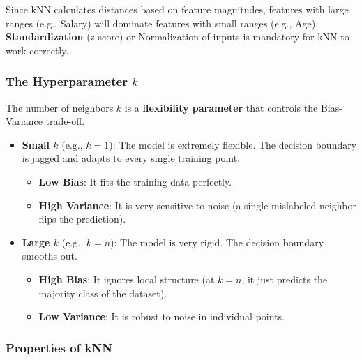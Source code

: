 \begin{tipsblock}
    Since kNN calculates distances based on feature magnitudes, features with large ranges (e.g., Salary) will dominate features with small ranges (e.g., Age). \textbf{Standardization} (z-score) or Normalization of inputs is mandatory for kNN to work correctly.
\end{tipsblock}

\subsubsection{The Hyperparameter $k$}

The number of neighbors $k$ is a \textbf{flexibility parameter} that controls the Bias-Variance trade-off.

\begin{itemize}
    \item \textbf{Small $k$} (e.g., $k=1$): The model is extremely flexible. The decision boundary is jagged and adapts to every single training point.
    \begin{itemize}
        \item \textbf{Low Bias}: It fits the training data perfectly.
        \item \textbf{High Variance}: It is very sensitive to noise (a single mislabeled neighbor flips the prediction).
    \end{itemize}

    \item \textbf{Large $k$} (e.g., $k=n$): The model is very rigid. The decision boundary smooths out.
    \begin{itemize}
        \item \textbf{High Bias}: It ignores local structure (at $k=n$, it just predicts the majority class of the dataset).
        \item \textbf{Low Variance}: It is robust to noise in individual points.
    \end{itemize}
\end{itemize}

\subsubsection{Properties of kNN}


